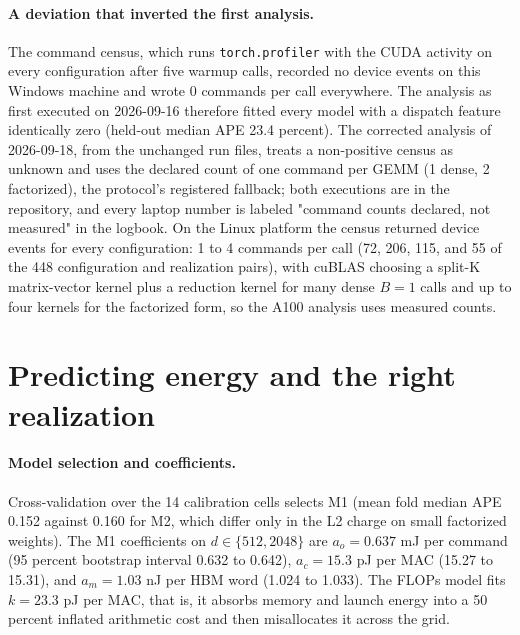 \documentclass{article}
\begin{document}
\paragraph{A deviation that inverted the first analysis.} The command census, which runs \texttt{torch.profiler} with the CUDA activity on every configuration after five warmup calls, recorded no device events on this Windows machine and wrote 0 commands per call everywhere. The analysis as first executed on 2026-09-16 therefore fitted every model with a dispatch feature identically zero (held-out median APE 23.4 percent). The corrected analysis of 2026-09-18, from the unchanged run files, treats a non-positive census as unknown and uses the declared count of one command per GEMM (1 dense, 2 factorized), the protocol's registered fallback; both executions are in the repository, and every laptop number is labeled "command counts declared, not measured" in the logbook. On the Linux platform the census returned device events for every configuration: 1 to 4 commands per call (72, 206, 115, and 55 of the 448 configuration and realization pairs), with cuBLAS choosing a split-K matrix-vector kernel plus a reduction kernel for many dense $B = 1$ calls and up to four kernels for the factorized form, so the A100 analysis uses measured counts.

\section{Predicting energy and the right realization}
\label{sec:models}

\paragraph{Model selection and coefficients.} Cross-validation over the 14 calibration cells selects M1 (mean fold median APE 0.152 against 0.160 for M2, which differ only in the L2 charge on small factorized weights). The M1 coefficients on $d \in \{512, 2048\}$ are $a_o = 0.637$ mJ per command (95 percent bootstrap interval 0.632 to 0.642), $a_c = 15.3$ pJ per MAC (15.27 to 15.31), and $a_m = 1.03$ nJ per HBM word (1.024 to 1.033). The FLOPs model fits $k = 23.3$ pJ per MAC, that is, it absorbs memory and launch energy into a 50 percent inflated arithmetic cost and then misallocates it across the grid.
\end{document}
